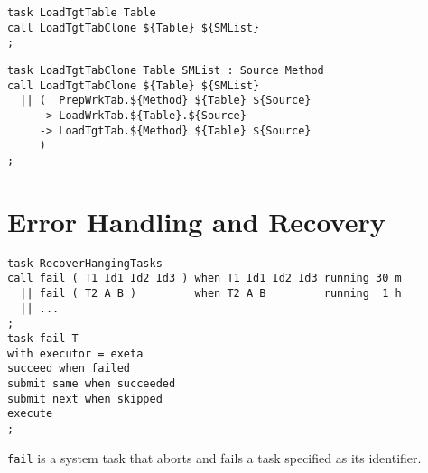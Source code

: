 \documentclass[a4paper,12pt,english,oneside]{book}
\begin{document}
\begin{verbatim}
task LoadTgtTable Table
call LoadTgtTabClone ${Table} ${SMList}
;
\end{verbatim}

\begin{verbatim}
task LoadTgtTabClone Table SMList : Source Method
call LoadTgtTabClone ${Table} ${SMList}
  || (  PrepWrkTab.${Method} ${Table} ${Source}
     -> LoadWrkTab.${Table}.${Source}
     -> LoadTgtTab.${Method} ${Table} ${Source}
     )
;
\end{verbatim}

%
%
\section{Error Handling and Recovery}

\begin{verbatim}
task RecoverHangingTasks
call fail ( T1 Id1 Id2 Id3 ) when T1 Id1 Id2 Id3 running 30 m
  || fail ( T2 A B )         when T2 A B         running  1 h
  || ...
;
task fail T
with executor = exeta
succeed when failed
submit same when succeeded
submit next when skipped
execute
;
\end{verbatim}
\verb|fail| is a system task that aborts and fails a task specified as its identifier.
\end{document}
